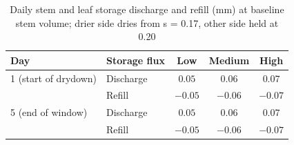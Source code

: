\begin{table}[H]
\centering
\caption{Daily stem and leaf storage discharge and refill (mm) at baseline stem volume; drier side dries from s = 0.17, other side held at 0.20}
\label{tab:vwt_s2_one_daily_storage}
\begin{tabular}{llccc}
\hline
Day & Storage flux & Low & Medium & High \\
\hline
1 (start of drydown) & Discharge & $0.05$ & $0.06$ & $0.07$ \\
 & Refill & $-0.05$ & $-0.06$ & $-0.07$ \\
\hline
5 (end of window) & Discharge & $0.05$ & $0.06$ & $0.07$ \\
 & Refill & $-0.05$ & $-0.06$ & $-0.07$ \\
\hline
\end{tabular}
\end{table}
